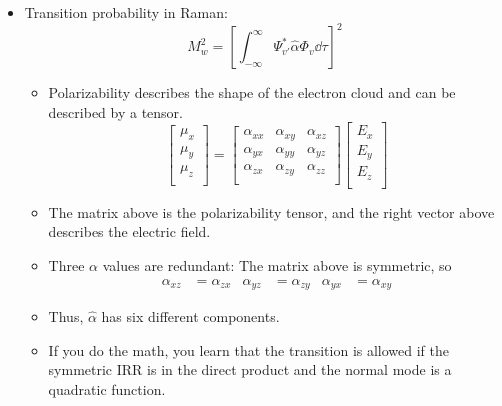 \documentclass[../notes.tex]{subfiles}
\begin{document}
\begin{itemize}
    \item Transition probability in Raman:
    \begin{equation*}
        M_w^2 = \left[ \int_{-\infty}^\infty\Psi_{v'}^*\hat{\alpha}\Phi_v\dd\tau \right]^2
    \end{equation*}
    \begin{itemize}
        \item Polarizability describes the shape of the electron cloud and can be described by a tensor.
        \begin{equation*}
            \begin{bmatrix}
                \mu_x\\
                \mu_y\\
                \mu_z\\
            \end{bmatrix}
            =
            \begin{bmatrix}
                \alpha_{xx} & \alpha_{xy} & \alpha_{xz}\\
                \alpha_{yx} & \alpha_{yy} & \alpha_{yz}\\
                \alpha_{zx} & \alpha_{zy} & \alpha_{zz}\\
            \end{bmatrix}
            \begin{bmatrix}
                E_x\\
                E_y\\
                E_z\\
            \end{bmatrix}
        \end{equation*}
        \item The matrix above is the polarizability tensor, and the right vector above describes the electric field.
        \item Three $\alpha$ values are redundant: The matrix above is symmetric, so
        \begin{align*}
            \alpha_{xz} &= \alpha_{zx}&
            \alpha_{yz} &= \alpha_{zy}&
            \alpha_{yx} &= \alpha_{xy}
        \end{align*}
        \item Thus, $\hat{\alpha}$ has six different components.
        \item If you do the math, you learn that the transition is allowed if the symmetric IRR is in the direct product and the normal mode is a quadratic function.
    \end{itemize}

\end{itemize}
\end{document}
